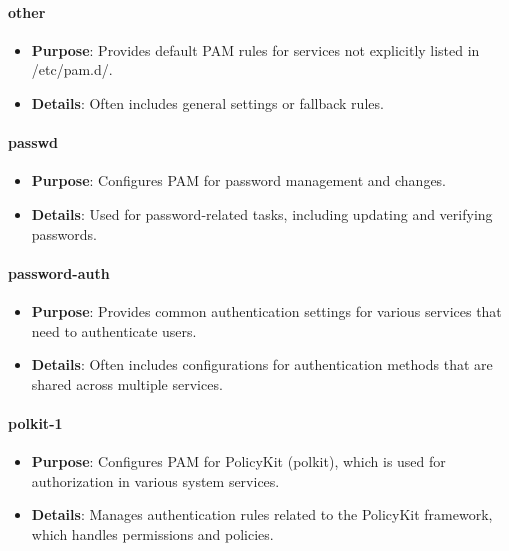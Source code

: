 \documentclass{article}
\begin{document}
\paragraph{other}

\begin{itemize}
    \item \textbf{Purpose}: Provides default PAM rules for services not explicitly listed in /etc/pam.d/.
    \item \textbf{Details}: Often includes general settings or fallback rules.
\end{itemize}

\paragraph{passwd}

\begin{itemize}
    \item \textbf{Purpose}: Configures PAM for password management and changes.
    \item \textbf{Details}: Used for password-related tasks, including updating and verifying passwords.
\end{itemize}

\paragraph{password-auth}

\begin{itemize}
    \item \textbf{Purpose}: Provides common authentication settings for various services that need to authenticate users.
    \item \textbf{Details}: Often includes configurations for authentication methods that are shared across multiple services.
\end{itemize}

\paragraph{polkit-1}

\begin{itemize}
    \item \textbf{Purpose}: Configures PAM for PolicyKit (polkit), which is used for authorization in various system services.
    \item \textbf{Details}: Manages authentication rules related to the PolicyKit framework, which handles permissions and policies.
\end{itemize}
\end{document}
